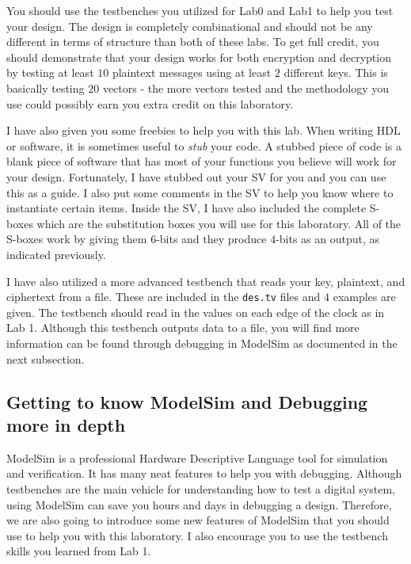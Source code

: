 \documentclass{article}
\begin{document}
You should use the testbenches you utilized for Lab0 and Lab1 to help
you test your design.  The design is completely combinational and
should not be any different in terms of structure than both of these
labs.  To get full credit, you should demonstrate that your design
works for both encryption and decryption by testing at least $10$
plaintext messages using at least $2$ different keys.  This is
basically testing $20$ vectors - the more vectors tested and the
methodology you use could possibly
earn you extra credit on this laboratory.

I have also given you some freebies to help you with this lab.  When
writing HDL or software, it is sometimes useful to \textit{stub} your
code.  A stubbed piece of code is a blank piece of software that has
most of your functions you believe will work for your design.
Fortunately, I have stubbed out your SV for you and you can use this
as a guide.  I also put some comments in the SV to help you know where
to instantiate certain items.
Inside the SV, I have also included the complete S-boxes
which are the substitution boxes you will use for
this laboratory.  All of the S-boxes work by giving them $6$-bits and
they produce $4$-bits as an output, as indicated previously.

I have also utilized a more advanced testbench that reads your
key, plaintext, and ciphertext from a file.  These are included in the
\verb!des.tv! files and $4$ examples are given.  The testbench should
read in the values on each edge of the clock as in Lab 1.  Although
this testbench outputs data to a file, you will find more information
can be found through debugging in ModelSim as documented in the next
subsection.

\subsection{Getting to know ModelSim and Debugging more in depth}

ModelSim is a professional Hardware Descriptive Language tool for
simulation and verification.  It has many neat features to help you
with debugging.  Although testbenches are the main vehicle for
understanding how to test a digital system, using ModelSim can save
you hours and days in debugging a design.  Therefore, we are also
going to introduce some new features of ModelSim that you should use
to help you with this laboratory. I also encourage you to use the
testbench skills you learned from Lab 1.
\end{document}
